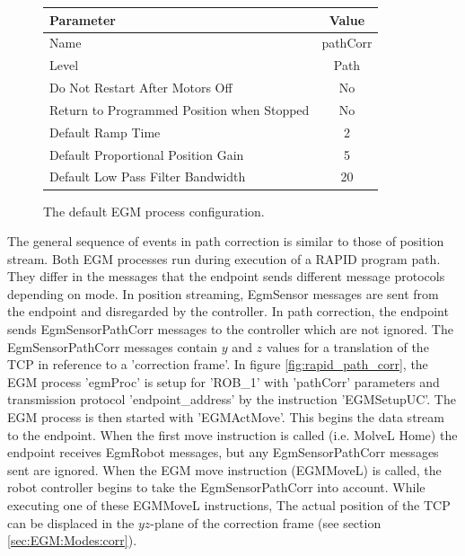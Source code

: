 \documentclass{cslthse-msc}
\begin{document}
\begin{figure}[H]
    \centering
    \footnotesize{
    \begin{tabular}{| l | c |}
    \hline
        \textbf{Parameter} & \textbf{Value} \\ \hline
        Name        &   pathCorr \\
        Level       &   Path   \\
        Do Not Restart After Motors Off & No    \\
        Return to Programmed Position when Stopped & No \\
        Default Ramp Time & 2   \\
        Default Proportional Position Gain & 5  \\
        Default Low Pass Filter Bandwidth & 20  \\ \hline
    \end{tabular}
    }
    \caption{The default EGM process configuration.}
    \label{fig:pathcorr_config}
\end{figure}

The general sequence of events in path correction is similar to those of position stream. Both EGM processes run during execution of a RAPID program path. They differ in the messages that the endpoint sends different message protocols depending on mode. In position streaming, EgmSensor messages are sent from the endpoint and disregarded by the controller. In path correction, the endpoint sends EgmSensorPathCorr messages to the controller which are not ignored. The EgmSensorPathCorr messages contain $y$ and $z$ values for a translation of the TCP in reference to a 'correction frame'. In figure \ref{fig:rapid_path_corr}, the EGM process 'egmProc' is setup for 'ROB\_1' with 'pathCorr' parameters and transmission protocol 'endpoint\_address' by the instruction 'EGMSetupUC'. The EGM process is then started with 'EGMActMove'. This begins the data stream to the endpoint. When the first move instruction is called (i.e. MolveL Home) the endpoint receives EgmRobot messages, but any EgmSensorPathCorr messages sent are ignored. When the EGM move instruction (EGMMoveL) is called, the robot controller begins to take the EgmSensorPathCorr into account. While executing one of these EGMMoveL instructions, The actual position of the TCP can be displaced in the $yz$-plane of the correction frame (see section \ref{sec:EGM:Modes:corr}). 
\end{document}
